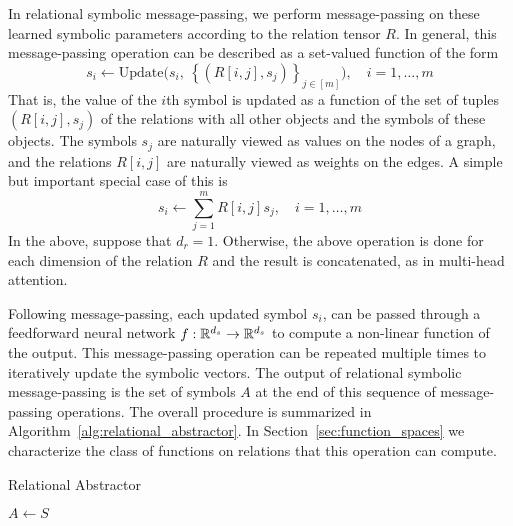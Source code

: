 In relational symbolic message-passing, we perform message-passing on these learned symbolic parameters according to the relation tensor $R$. In general, this message-passing operation can be described as a set-valued function of the form
\begin{equation}
    \label{eq:symbolic_message_passing}
    s_i \leftarrow \text{Update}\Big( s_i, \ \left\{ \left(R[i,j], s_j\right)\right\}_{j\in[m]}\Big), \quad i = 1, \ldots, m
\end{equation}
That is, the value of the $i$th symbol is updated as a function of the set of tuples $(R[i,j], s_j)$ of the relations with all other objects and the symbols of these objects. The symbols $s_j$ are naturally viewed
as values on the nodes of a graph, and the relations $R[i,j]$ are naturally viewed as weights on the edges. A simple but important special case of this is
\begin{equation}
    \label{eq:linear_symbolic_mp}
    s_i \leftarrow \sum_{j=1}^{m} R[i,j] s_j, \quad i=1, \ldots, m
\end{equation}
In the above, suppose that $d_r = 1$. Otherwise, the above operation is done for each dimension of the relation $R$ and the result is concatenated, as in multi-head attention.

Following message-passing, each updated symbol $s_i$, can be passed through a feedforward neural network $f:\mathbb{R}^{d_s}\rightarrow \mathbb{R}^{d_s}$ to compute a non-linear function of the output. %
This message-passing operation can be repeated multiple times to iteratively update the symbolic vectors.  The output of relational symbolic message-passing is the set of symbols $A$ at the end of this sequence of message-passing operations. The overall procedure is summarized in Algorithm~\ref{alg:relational_abstractor}. In Section~\ref{sec:function_spaces} we characterize the class of functions on relations that this operation can compute.

\begin{algorithm}[th!]
    \caption{Relational Abstractor}\label{alg:relational_abstractor}

    \vspace{1em}

    $A \gets S$

\end{algorithm}


